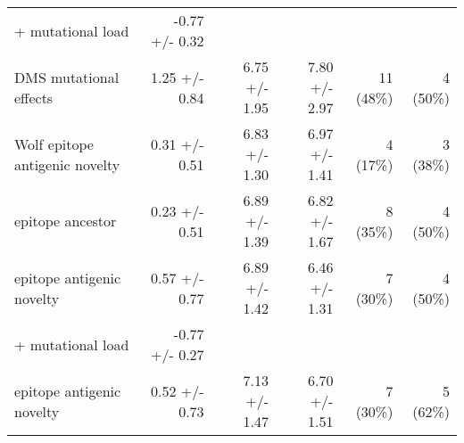 \begin{tabular*}{1.1\textwidth}{lrrrrr}
\hspace{5mm} + mutational load & -0.77 +/- 0.32 & & & & \\
DMS mutational effects & 1.25 +/- 0.84 & 6.75 +/- 1.95 & 7.80 +/- 2.97 & 11 (48\%) & 4 (50\%) \\
Wolf epitope antigenic novelty & 0.31 +/- 0.51 & 6.83 +/- 1.30 & 6.97 +/- 1.41 & 4 (17\%) & 3 (38\%) \\
epitope ancestor & 0.23 +/- 0.51 & 6.89 +/- 1.39 & 6.82 +/- 1.67 & 8 (35\%) & 4 (50\%) \\
epitope antigenic novelty & 0.57 +/- 0.77 & 6.89 +/- 1.42 & 6.46 +/- 1.31 & 7 (30\%) & 4 (50\%) \\
\hspace{5mm} + mutational load & -0.77 +/- 0.27 & & & & \\
epitope antigenic novelty & 0.52 +/- 0.73 & 7.13 +/- 1.47 & 6.70 +/- 1.51 & 7 (30\%) & 5 (62\%) \\

\bottomrule
\end{tabular*}
